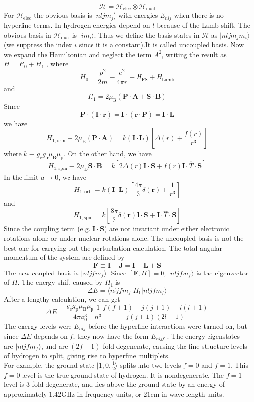 \[\mathcal{H} = \mathcal{H}_{\mathrm{elec}} \otimes \mathcal{H}_{\mathrm{nucl}}\]
For $\mathcal{H}_{\mathrm{elec}}$ the obvious basis is $|nljm_j\rangle$ with energies $E_{nlj}$ when there is no hyperfine terms. In hydrogen energies depend on $l$ because of the Lamb shift. The obvious basis in $\mathcal{H}_{\mathrm{nucl}}$ is $|im_i\rangle$. Thus we define the basis states in $\mathcal{H}$ as $|nljm_jm_i\rangle$ (we suppress the index $i$ since it is a constant).It is called uncoupled basis. Now we expand the Hamiltonian and neglect the term $A^2$, writing the result as $H = H_0 + H_1$ , where
\[H_0 = \frac{p^2}{2m} - \frac{e^2}{4\pi r}  + H_{\mathrm{FS}} + H_{\mathrm{Lamb}}\]
and
\[H_1 = 2\mu_{\mathrm{B}}(\bm{P}\cdot\bm{A} + \bm{S}\cdot\bm{B})\]
Since
\[\bm{P}\cdot(\bm{I}\cdot\bm{r}) = \bm{I}\cdot(\bm{r}\cdot\bm{P}) = \bm{I}\cdot\bm{L}\]
we have
\[H_{1,\mathrm{orbi}} \equiv 2\mu_{\mathrm{B}}(\bm{P}\cdot\bm{A}) = k(\bm{I}\cdot\bm{L}) \left[\Delta(r) + \frac{f(r)}{r^3}\right ]\]
where $k \equiv g_{\mathrm{e}}g_{\mathrm{p}}\mu_{\mathrm{B}}\mu_{\mathrm{p}}$.
On the other hand, we have
\[H_{1,\mathrm{spin}} \equiv 2\mu_{\mathrm{B}} \bm{S}\cdot\bm{B} = k\left [2\Delta(r)\bm{I}\cdot\bm{S} + f(r)\bm{I}\cdot\hat{T}\cdot\bm{S}\right ] \]
In the limit $a \to 0$, we have
\[H_{1,\mathrm{orbi}} = k(\bm{I}\cdot\bm{L}) \left[\frac{4\pi}{3}\delta(\bm{r}) + \frac{1}{r^3}\right ]\]
and
\[H_{1,\mathrm{spin}}  = k\left [\frac{8\pi}{3}\delta(\bm{r})\bm{I}\cdot\bm{S} + \bm{I}\cdot\hat{T}\cdot\bm{S}\right ] \]
Since the coupling term (e.g. $\bm{I}\cdot\bm{S}$) are not invariant under either electronic rotations alone or under nuclear rotations alone. The uncoupled basis is not the best one for carrying out the perturbation calculation. The total angular momentum of the system are defined by
\[\bm{F} \equiv \bm{I} + \bm{J} = \bm{I} + \bm{L} + \bm{S}\]
The new coupled basis is $|nljfm_f\rangle$. Since $[\bm{F},H] = 0$, $|nljfm_f\rangle$ is the eigenvector of $H$. The energy shift caused by $H_1$ is
\[\Delta E = \langle nljfm_f | H_1 | nljfm_f\rangle\]
After a lengthy calculation, we can get
\[\Delta E = \frac{g_{\mathrm{e}}g_{\mathrm{p}}\mu_{\mathrm{B}}\mu_{\mathrm{p}}}{4\pi a_0^3} \frac{1}{n^3} \frac{f(f+1)-j(j+1)-i(i+1)}{j(j+1)(2l+1)} \]
The energy levels were $E_{nlj}$ before the hyperfine interactions were turned on, but since $\Delta E$ depends on $f$, they now have the form $E_{nljf}$ . The energy eigenstates are $|nljfm_f\rangle$, and are $(2f+1)$-fold degenerate, causing the fine structure levels of hydrogen to split, giving rise to hyperfine multiplets. \\
For example, the ground state $|1,0,\frac{1}{2}\rangle$ splits into two levels $f = 0$ and $f = 1$. This $f = 0$ level is the true ground state of hydrogen. It is nondegenerate. The $f=1$ level is 3-fold degenerate, and lies above the ground state by an energy of approximately $1.42 \mathrm{GHz}$ in frequency
units, or $21 \mathrm{cm}$ in wave length units.

